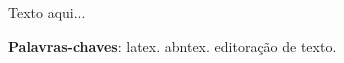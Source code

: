 \begin{resumo}

    Texto aqui...

    \textbf{Palavras-chaves}: latex. abntex. editoração de texto.
    
\end{resumo}